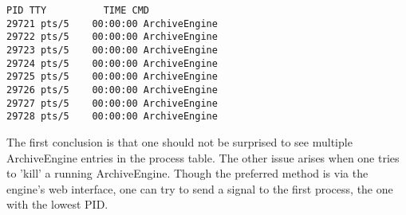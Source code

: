 \begin{lstlisting}[float=htb,
caption={Output of Linux 'ps' process list command, see text.},
label=lst:aeprocs]
  PID TTY          TIME CMD
29721 pts/5    00:00:00 ArchiveEngine
29722 pts/5    00:00:00 ArchiveEngine
29723 pts/5    00:00:00 ArchiveEngine
29724 pts/5    00:00:00 ArchiveEngine
29725 pts/5    00:00:00 ArchiveEngine
29726 pts/5    00:00:00 ArchiveEngine
29727 pts/5    00:00:00 ArchiveEngine
29728 pts/5    00:00:00 ArchiveEngine   
\end{lstlisting}

The first conclusion is that one should not be surprised to see
multiple ArchiveEngine entries in the process table.
The other issue arises when one tries to 'kill' a running
ArchiveEngine. Though the preferred method is via the engine's web
interface, one can try to send a signal to the first process, the one
with the lowest PID.

